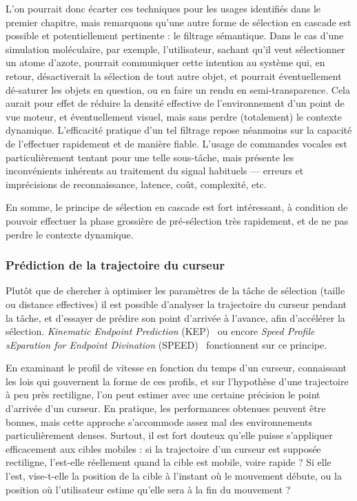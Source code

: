     L'on pourrait donc écarter ces techniques pour les usages identifiés dans le premier chapitre, mais remarquons qu'une autre forme de sélection en cascade est possible et potentiellement pertinente : le filtrage sémantique. Dans le cas d'une simulation moléculaire, par exemple, l'utilisateur, sachant qu'il veut sélectionner un atome d'azote, pourrait communiquer cette intention au système qui, en retour, désactiverait la sélection de tout autre objet, et pourrait éventuellement dé-saturer les objets en question, ou en faire un rendu en semi-transparence. Cela aurait pour effet de réduire la densité effective de l'environnement d'un point de vue moteur, et éventuellement visuel, mais sans perdre (totalement) le contexte dynamique. L'efficacité pratique d'un tel filtrage repose néanmoins sur la capacité de l'effectuer rapidement et de manière fiable. L'usage de commandes vocales est particulièrement tentant pour une telle sous-tâche, mais présente les inconvénients inhérents au traitement du signal habituels --- erreurs et imprécisions de reconnaissance, latence, coût, complexité, etc.
    
    En somme, le principe de sélection en cascade est fort intéressant, à condition de pouvoir effectuer la phase grossière de pré-sélection très rapidement, et de ne pas perdre le contexte dynamique.

	\subsubsection{Prédiction de la trajectoire du curseur}
    Plutôt que de chercher à optimiser les paramètres de la tâche de sélection (taille ou distance effectives) il est possible d'analyser la trajectoire du curseur pendant la tâche, et d'essayer de prédire son point d'arrivée à l'avance, afin d'accélérer la sélection. \emph{Kinematic Endpoint Prediction} (KEP)~\cite{lank2007endpoint} ou encore \emph{Speed Profile sEparation for Endpoint Divination} (SPEED)~\cite{wonner2011speed} fonctionnent sur ce principe.
    
    En examinant le profil de vitesse en fonction du temps d'un curseur, connaissant les lois qui gouvernent la forme de ces profils, et sur l'hypothèse d'une trajectoire à peu près rectiligne, l'on peut estimer avec une certaine précision le point d'arrivée d'un curseur. En pratique, les performances obtenues peuvent être bonnes, mais cette approche s'accommode assez mal des environnements particulièrement denses. Surtout, il est fort douteux qu'elle puisse s'appliquer efficacement aux cibles mobiles : si la trajectoire d'un curseur est supposée rectiligne, l'est-elle réellement quand la cible est mobile, voire rapide ? Si elle l'est, vise-t-elle la position de la cible à l'instant où le mouvement débute, ou la position où l'utilisateur estime qu'elle sera à la fin du mouvement ?
    
